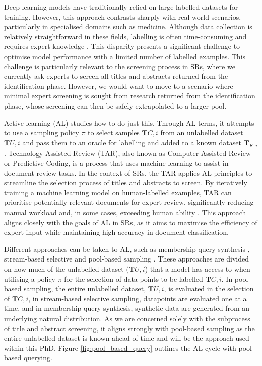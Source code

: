 \documentclass[10pt, english]{article}
\begin{document}
Deep-learning models have traditionally relied on large-labelled datasets for training. However, this approach contrasts sharply with real-world scenarios, particularly in specialised domains such as medicine. Although data collection is relatively straightforward in these fields, labelling is often time-consuming and requires expert knowledge \cite{smith_less_2018, hoi_batch_2006}. This disparity presents a significant challenge to optimise model performance with a limited number of labelled examples. This challenge is particularly relevant to the screening process in SRs, where we currently ask experts to screen all titles and abstracts returned from the identification phase. However, we would want to move to a scenario where minimal expert screening is sought from research returned from the identification phase, whose screening can then be safely extrapolated to a larger pool.

Active learning (AL) studies how to do just this. Through AL terms, it attempts to use a sampling policy $\pi$ to select samples $\mathbf{T}{C,i}$ from an unlabelled dataset $\mathbf{T}{U,i}$ and pass them to an oracle for labelling and added to a known dataset $\mathbf{T}_{K,i}$. Technology-Assisted Review (TAR), also known as Computer-Assisted Review or Predictive Coding, is a process that uses machine learning to assist in document review tasks. In the context of SRs, the TAR applies AL principles to streamline the selection process of titles and abstracts to screen. By iteratively training a machine learning model on human-labelled examples, TAR can prioritise potentially relevant documents for expert review, significantly reducing manual workload and, in some cases, exceeding human ability \cite{grossman_technology-assisted_2010}. This approach aligns closely with the goals of AL in SRs, as it aims to maximise the efficiency of expert input while maintaining high accuracy in document classification. 

Different approaches can be taken to AL, such as membership query synthesis \cite{angluin_queries_1988}, stream-based selective \cite{akinseloyin_novel_2024} and pool-based sampling \cite{lewis_sequential_1994}. These approaches are divided on how much of the unlabelled dataset ($\mathbf{T}{U, i}$) that a model has access to when utilising a policy $\pi$ for the selection of data points to be labelled $\mathbf{T}{C,i}$. In pool-based sampling, the entire unlabelled dataset, $\mathbf{T}{U,i}$, is evaluated in the selection of $\mathbf{T}{C,i}$, in stream-based selective sampling, datapoints are evaluated one at a time, and in membership query synthesis, synthetic data are generated from an underlying natural distribution. As we are concerned solely with the subprocess of title and abstract screening, it aligns strongly with pool-based sampling as the entire unlabelled dataset is known ahead of time and will be the approach used within this PhD. Figure \ref{fig:pool_based_query} outlines the AL cycle with pool-based querying.
\end{document}
